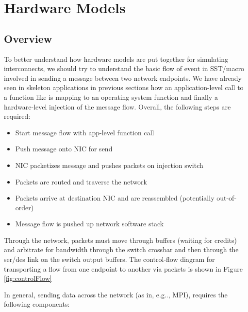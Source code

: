 

\chapter{Hardware Models}
\label{chapter:hardware}

\section{Overview}
\label{sec:topOverview}
To better understand how hardware models are put together for simulating interconnects, we should try to understand the basic flow of event in SST/macro involved in sending a message between two network endpoints.  We have already seen in skeleton applications in previous sections how an application-level call to a function like  is mapping to an operating system function and finally a hardware-level injection of the message flow.  Overall, the following steps are required:

\begin{itemize}
\item Start message flow with app-level function call
\item Push message onto NIC for send
\item NIC packetizes message and pushes packets on injection switch
\item Packets are routed and traverse the network
\item Packets arrive at destination NIC and are reassembled (potentially out-of-order)
\item Message flow is pushed up network software stack
\end{itemize}

Through the network, packets must move through buffers (waiting for credits) and arbitrate for bandwidth through the switch crossbar and then through the ser/des link on the switch output buffers.  The control-flow diagram for transporting a flow from one endpoint to another via packets is shown in Figure \ref{fig:controlFlow}

In general, sending data across the network (as in, e.g.., MPI), requires the following components:

